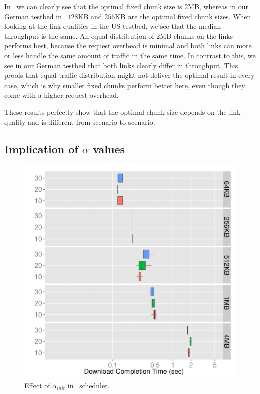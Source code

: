 In~ we can clearly see that the optimal fixed chunk size is $2$MB, whereas in our German testbed in~ $128$KB and $256$KB are the optimal fixed chunk sizes. 
When looking at the link qualities in the US testbed, we see that the median throughput is the same. 
An equal distribution of $2$MB chunks on the links performs best, because the request overhead is minimal and both links can more or less handle the same amount of traffic in the same time. 
In contrast to this, we see in our German testbed that both links clearly differ in throughput. 
This proofs that equal traffic distribution might not deliver the optimal result in every case, which is why smaller fixed chunks perform better here, even though they come with a higher request overhead. 

These results perfectly show that the optimal chunk size depends on the link quality and is different from scenario to scenario. 

\pagebreak
\subsection{Implication of $\alpha$ values}
\label{sec:evaluation-alpha}

\begin{figure}[!htb]
    \begin{minipage}[t]{0.8\linewidth}
	\begin{center}
        \includegraphics[width=\linewidth]{Figures/dynamic-alpha-alpha.pdf}
		\caption{\label{fig:evaluation-alpha-value-a}Effect of $\alpha_{init}$ in \algalpha~scheduler.}
    \end{center}
    \end{minipage}
\vspace*{-0.3cm}
\end{figure}

